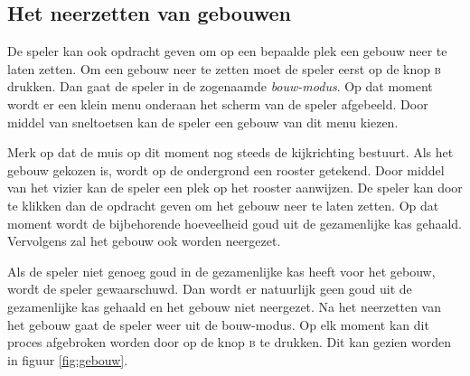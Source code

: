 \FloatBarrier
\subsection{Het neerzetten van gebouwen}
De speler kan ook opdracht geven om op een bepaalde plek een gebouw neer te laten zetten. Om een gebouw neer te zetten moet de speler eerst op de knop \textsc{b} drukken. Dan gaat de speler in de zogenaamde \emph{bouw-modus}. Op dat moment wordt er een klein menu onderaan het scherm van de speler afgebeeld. Door middel van sneltoetsen kan de speler een gebouw van dit menu kiezen.

Merk op dat de muis op dit moment nog steeds de kijkrichting bestuurt. Als het gebouw gekozen is, wordt op de ondergrond een rooster getekend. Door middel van het vizier kan de speler een plek op het rooster aanwijzen. De speler kan door te klikken dan de opdracht geven om het gebouw neer te laten zetten. Op dat moment wordt de bijbehorende hoeveelheid goud uit de gezamenlijke kas gehaald. Vervolgens zal het gebouw ook worden neergezet.

Als de speler niet genoeg goud in de gezamenlijke kas heeft voor het gebouw, wordt de speler gewaarschuwd. Dan wordt er natuurlijk geen goud uit de gezamenlijke kas gehaald en het gebouw niet neergezet. Na het neerzetten van het gebouw gaat de speler weer uit de bouw-modus. Op elk moment kan dit proces afgebroken worden door op de knop \textsc{b} te drukken. Dit kan gezien worden in figuur \ref{fig:gebouw}.

